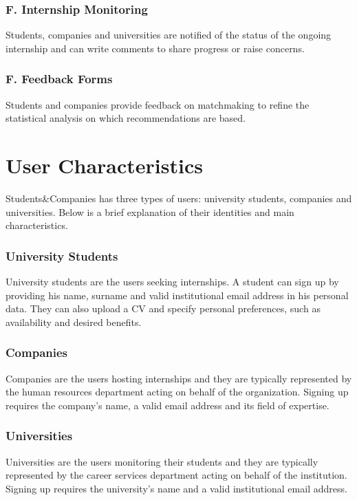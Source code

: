\subsubsection*{F\fc. Internship Monitoring}
Students, companies and universities are notified of the status of the ongoing internship and can write comments to share progress or raise concerns.

\subsubsection*{F\fc. Feedback Forms}
Students and companies provide feedback on matchmaking to refine the statistical analysis on which recommendations are based.

\section{User Characteristics}
Students\&Companies has three types of users: university students, companies and universities.
Below is a brief explanation of their identities and main characteristics.

\subsubsection{University Students}
University students are the users seeking internships.
A student can sign up by providing his name, surname and valid institutional email address in his personal data.
They can also upload a CV and specify personal preferences, such as availability and desired benefits.

\subsubsection{Companies}
Companies are the users hosting internships and they are typically represented by the human resources department acting on behalf of the organization.
Signing up requires the company's name, a valid email address and its field of expertise.

\subsubsection{Universities}
Universities are the users monitoring their students and they are typically represented by the career services department acting on behalf of the institution.
Signing up requires the university's name and a valid institutional email address.

